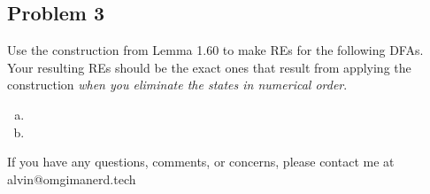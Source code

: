 \documentclass{math}
\begin{document}
\subsection*{Problem 3}
Use the construction from Lemma 1.60 to make REs for the following DFAs. Your
resulting REs should be the exact ones that result from applying the
construction \textit{when you eliminate the states in numerical order}.
\begin{enumerate}[(a)]
  \item
  \item
\end{enumerate}

\begin{center}
  If you have any questions, comments, or concerns, please contact me at
  alvin@omgimanerd.tech
\end{center}
\end{document}
